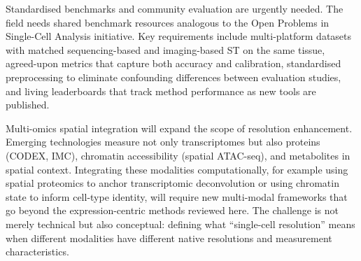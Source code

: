 Standardised benchmarks and community evaluation are urgently needed. The field needs shared benchmark resources analogous to the Open Problems in Single-Cell Analysis initiative. Key requirements include multi-platform datasets with matched sequencing-based and imaging-based ST on the same tissue, agreed-upon metrics that capture both accuracy and calibration, standardised preprocessing to eliminate confounding differences between evaluation studies, and living leaderboards that track method performance as new tools are published.

Multi-omics spatial integration will expand the scope of resolution enhancement. Emerging technologies measure not only transcriptomes but also proteins (CODEX, IMC), chromatin accessibility (spatial ATAC-seq), and metabolites in spatial context. Integrating these modalities computationally, for example using spatial proteomics to anchor transcriptomic deconvolution or using chromatin state to inform cell-type identity, will require new multi-modal frameworks that go beyond the expression-centric methods reviewed here. The challenge is not merely technical but also conceptual: defining what ``single-cell resolution'' means when different modalities have different native resolutions and measurement characteristics.
